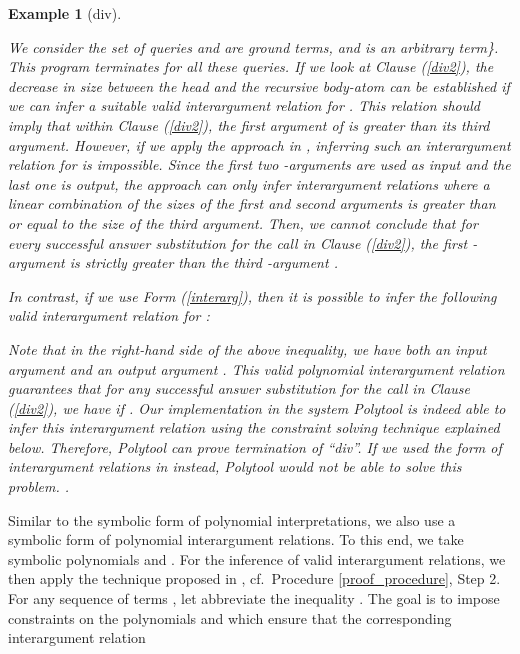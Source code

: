 \documentclass[envcountsame]{tlp}
\newcounter{ex:der-lastsymconsctr}
\newtheorem{example}{Example}
\begin{document}
\begin{example}[div]
\label{div}


We consider the set of queries    and  are ground terms, and  is an arbitrary 
term\}.
This program terminates for all these queries. If we look at Clause (\ref{div2}),
the decrease in size between the head and the recursive body-atom can be established if
we can infer a suitable valid interargument relation for . This relation 
should imply that within Clause (\ref{div2}), the 
first argument of  is greater than its third argument. However, if we apply the
approach in \cite{Decorteetal98}, inferring such an interargument relation for
 is impossible. Since  the
first two -arguments are used as input and the last one is output,
the approach can only infer interargument
relations where a linear combination of the sizes of the first
and second arguments is greater than or equal to the size of the third
argument. Then, we cannot conclude 
that for every successful answer substitution for the call  in Clause
(\ref{div2}), the first -argument  is strictly greater than the 
third -argument .

In contrast, if we use Form (\ref{interarg}), then it
is possible to infer the following valid interargument relation for : 
 
Note that in the right-hand side   of the 
above inequality, we have both an input argument  and an output
argument .
This valid polynomial interargument relation guarantees that for any
successful answer substitution for
the call  in Clause (\ref{div2}), we have
 if
.
Our implementation in the system
\textsf{Polytool} is indeed able to infer this
interargument relation using the constraint solving technique explained below.
Therefore, \textsf{Polytool} can
prove termination of
``\textit{div}''. 
If
we used the form of interargument relations in \cite{Decorteetal98} instead,
\textsf{Polytool} would not be able to solve this problem.
\hfill{}.
\end{example}




Similar to the symbolic form of polynomial interpretations, we also use
a symbolic form of polynomial interargument relations. To this end,
we take
symbolic  polynomials  and
. For the inference of valid interargument relations, we then apply the technique
proposed in \cite{Decorteetal98}, cf.\ Procedure \ref{proof_procedure}, Step 2.
For any sequence of terms , let  abbreviate
the inequality  . 
The goal is to impose constraints on the polynomials  and  which
ensure that the corresponding interargument relation
\end{document}
